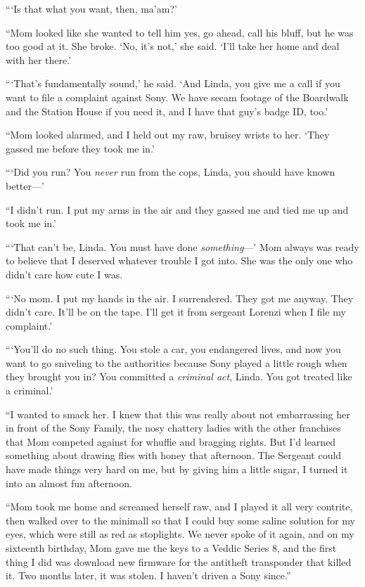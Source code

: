 “‘Is that what you want, then, ma’am?’

“Mom looked like she wanted to tell him yes, go ahead, call his
bluff, but he was too good at it. She broke. ‘No, it’s not,’ she
said. ‘I’ll take her home and deal with her there.’

“‘That’s fundamentally sound,’ he said. ‘And Linda, you give me a
call if you want to file a complaint against Sony. We have secam
footage of the Boardwalk and the Station House if you need it, and
I have that guy’s badge ID, too.’

“Mom looked alarmed, and I held out my raw, bruisey wrists to her.
‘They gassed me before they took me in.’

“‘Did you run? You \emph{never} run from the cops, Linda, you
should have known better—’

“I didn’t run. I put my arms in the air and they gassed me and tied
me up and took me in.’

“‘That can’t be, Linda. You must have done \emph{something}—’ Mom
always was ready to believe that I deserved whatever trouble I got
into. She was the only one who didn’t care how cute I was.

“‘No mom. I put my hands in the air. I surrendered. They got me
anyway. They didn’t care. It’ll be on the tape. I’ll get it from
sergeant Lorenzi when I file my complaint.’

“‘You’ll do no such thing. You stole a car, you endangered lives,
and now you want to go sniveling to the authorities because Sony
played a little rough when they brought you in? You committed a
\emph{criminal act}, Linda. You got treated like a criminal.’

“I wanted to smack her. I knew that this was really about not
embarrassing her in front of the Sony Family, the nosy chattery
ladies with the other franchises that Mom competed against for
whuffie and bragging rights. But I’d learned something about
drawing flies with honey that afternoon. The Sergeant could have
made things very hard on me, but by giving him a little sugar, I
turned it into an almost fun afternoon.

“Mom took me home and screamed herself raw, and I played it all
very contrite, then walked over to the minimall so that I could buy
some saline solution for my eyes, which were still as red as
stoplights. We never spoke of it again, and on my sixteenth
birthday, Mom gave me the keys to a Veddic Series 8, and the first
thing I did was download new firmware for the antitheft transponder
that killed it. Two months later, it was stolen. I haven’t driven a
Sony since.”

